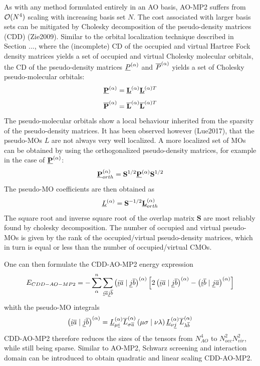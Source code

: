 As with any method formulated entirely in an AO basis, AO-MP2 suffers from $\mathcal{O}(N^{4})$ scaling with increasing basis set $N$. The cost associated with larger basis sets can be mitigated by Cholesky decomposition of the pseudo-density matrices (CDD) (Zie2009). Similar to the orbital localization technique described in Section ..., where the (incomplete) CD of the occupied and virtual Hartree Fock density matrices yields a set of occupied and virtual Cholesky molecular orbitals, the CD of the pseudo-density matrices $\underline{P}^{(\alpha)}$ and $\overline{P}^{(\alpha)}$ yields a set of Cholesky pseudo-molecular orbitals: 
\begin{equation}
\mathbf{\underline{P}}^{(\alpha)} = \mathbf{\underline{L}}^{(\alpha)} \mathbf{\underline{L}}^{(\alpha)T}
\end{equation}
\begin{equation}
\mathbf{\overline{P}}^{(\alpha)} = \mathbf{\overline{L}}^{(\alpha)} \mathbf{\overline{L}}^{(\alpha)T}
\end{equation} 
\noindent The pseudo-molecular orbitals show a local behaviour inherited from the sparsity of the pseudo-density matrices. It has been observed however (Lue2017), that the pseudo-MOs $L$ are not always very well localized. A more localized set of MOs can be obtained by using the orthogonalized pseudo-density matrices, for example in the case of $\mathbf{\underline{P}}^{(\alpha)}$:
\begin{equation}
\mathbf{\underline{P}}^{(\alpha)}_{orth} = \mathbf{S}^{1/2} \mathbf{\underline{P}}^{(\alpha)} \mathbf{S}^{1/2}
\end{equation}
\noindent The pseudo-MO coefficients are then obtained as
\begin{equation}
\underline{L}^{(\alpha)} = \mathbf{S}^{-1/2} \mathbf{\underline{L}}^{(\alpha)}_{orth}
\end{equation}
\noindent The square root and inverse square root of the overlap matrix $\mathbf{S}$ are most reliably found by cholesky decomposition. The number of occupied and virtual pseudo-MOs is given by the rank of the occupied/virtual pseudo-density matrices, which in turn is equal or less than the number of occupied/virtual CMOs. 

One can then formulate the CDD-AO-MP2 energy expression
\begin{equation}
E_{CDD-AO-MP2} = - \sum_{\alpha}^n \sum_{\underline{i}\overline{a}\underline{j}\overline{b}} \left( \underline{i}\overline{a} \mid \underline{j}\overline{b} \right)^{(\alpha)} \left [ 2\left( \underline{i}\overline{a} \mid \underline{j}\overline{b} \right)^{(\alpha)} -  \left( \underline{i}\overline{b} \mid \underline{j}\overline{a} \right)^{(\alpha)} \right]
\end{equation}
\noindent whith the pseudo-MO integrals
\begin{equation}
\left( \underline{i}\overline{a} \mid \underline{j}\overline{b} \right)^{(\alpha)} = \underline{L}^{(\alpha)}_{\mu\underline{i}} \overline{L}^{(\alpha)}_{\sigma\overline{a}} \left( \mu\sigma \mid \nu\lambda \right) \underline{L}^{(\alpha)}_{\nu\underline{j}} \overline{L}^{(\alpha)}_{\lambda\overline{b}}
\end{equation}
\noindent CDD-AO-MP2 therefore reduces the sizes of the tensors from $N^{4}_{AO}$ to $N_{occ}^2N_{vir}^2$, while still being sparse. Similar to AO-MP2, Schwarz screening and interaction domain can be introduced to obtain quadratic and linear scaling CDD-AO-MP2.

